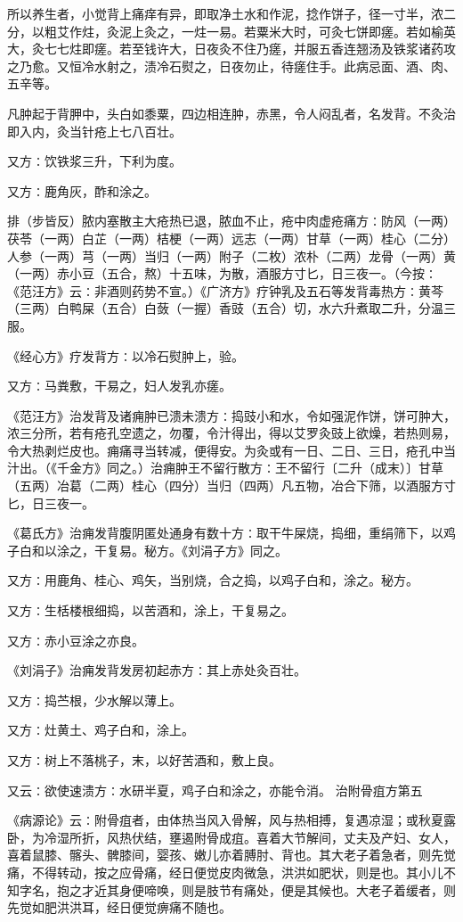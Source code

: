 \documentclass[a4paper,12pt,UTF8,twoside]{ctexbook}
\begin{document}
所以养生者，小觉背上痛痒有异，即取净土水和作泥，捻作饼子，径一寸半，浓二分，以粗艾作炷，灸泥上灸之，一炷一易。若粟米大时，可灸七饼即瘥。若如榆英大，灸七七炷即瘥。若至钱许大，日夜灸不住乃瘥，并服五香连翘汤及铁浆诸药攻之乃愈。又恒冷水射之，渍冷石熨之，日夜勿止，待瘥住手。此病忌面、酒、肉、五辛等。

凡肿起于背胛中，头白如黍粟，四边相连肿，赤黑，令人闷乱者，名发背。不灸治即入内，灸当针疮上七八百壮。

又方∶饮铁浆三升，下利为度。

又方∶鹿角灰，酢和涂之。

排（步皆反）脓内塞散主大疮热已退，脓血不止，疮中肉虚疮痛方∶防风（一两）茯苓（一两）白芷（一两）桔梗（一两）远志（一两）甘草（一两）桂心（二分）人参（一两）芎（一两）当归（一两）附子（二枚）浓朴（二两）龙骨（一两）黄（一两）赤小豆（五合，熬）十五味，为散，酒服方寸匕，日三夜一。（今按∶《范汪方》云∶非酒则药势不宣。）《广济方》疗钟乳及五石等发背毒热方∶黄芩（三两）白鸭屎（五合）白蔹（一握）香豉（五合）切，水六升煮取二升，分温三服。

《经心方》疗发背方∶以冷石熨肿上，验。

又方∶马粪敷，干易之，妇人发乳亦瘥。

《范汪方》治发背及诸痈肿已溃未溃方∶捣豉小和水，令如强泥作饼，饼可肿大，浓三分所，若有疮孔空遗之，勿覆，令汁得出，得以艾罗灸豉上欲燥，若热则易，令大热剥烂皮也。痈痛寻当转减，便得安。为灸或有一日、二日、三日，疮孔中当汁出。（《千金方》同之。）治痈肿王不留行散方∶王不留行〔二升（成末）〕甘草（五两）冶葛（二两）桂心（四分）当归（四两）凡五物，冶合下筛，以酒服方寸匕，日三夜一。

《葛氏方》治痈发背腹阴匿处通身有数十方∶取干牛屎烧，捣细，重绢筛下，以鸡子白和以涂之，干复易。秘方。《刘涓子方》同之。

又方∶用鹿角、桂心、鸡矢，当别烧，合之捣，以鸡子白和，涂之。秘方。

又方∶生栝楼根细捣，以苦酒和，涂上，干复易之。

又方∶赤小豆涂之亦良。

《刘涓子》治痈发背发房初起赤方∶其上赤处灸百壮。

又方∶捣苎根，少水解以薄上。

又方∶灶黄土、鸡子白和，涂上。

又方∶树上不落桃子，末，以好苦酒和，敷上良。

又云∶欲使速溃方∶水研半夏，鸡子白和涂之，亦能令消。
治附骨疽方第五

《病源论》云∶附骨疽者，由体热当风入骨解，风与热相搏，复遇凉湿；或秋夏露卧，为冷湿所折，风热伏结，壅遏附骨成疽。喜着大节解间，丈夫及产妇、女人，喜着鼠膝、髂头、髀膝间，婴孩、嫩儿亦着膊肘、背也。其大老子着急者，则先觉痛，不得转动，按之应骨痛，经日便觉皮肉微急，洪洪如肥状，则是也。其小儿不知字名，抱之才近其身便啼唤，则是肢节有痛处，便是其候也。大老子着缓者，则先觉如肥洪洪耳，经日便觉痹痛不随也。
\end{document}
